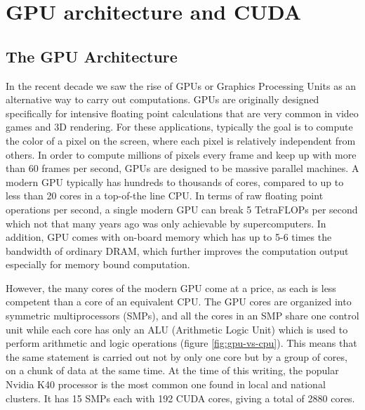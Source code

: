 
\chapter{GPU architecture and CUDA}
\label{app:gpu}


\section{The GPU Architecture}
\label{sec:gpu-arch}

In the recent decade we saw the rise of GPUs or Graphics Processing Units as an
alternative way to carry out computations. GPUs are originally designed
specifically for intensive floating point calculations that are very common in
video games and 3D rendering. For these applications, typically the goal is to
compute the color of a pixel on the screen, where each pixel is relatively
independent from others. In order to compute millions of pixels every frame and
keep up with more than 60 frames per second, GPUs are designed to be massive
parallel machines. A modern GPU typically has hundreds to thousands of cores,
compared to up to less than 20 cores in a top-of-the line CPU. In terms of raw
floating point operations per second, a single modern GPU can break 5 TetraFLOPs
per second which not that many years ago was only achievable by supercomputers.
In addition, GPU comes with on-board memory which has up to 5-6 times the
bandwidth of ordinary DRAM, which further improves the computation output
especially for memory bound computation.

However, the many cores of the modern GPU come at a price, as each is less
competent than a core of an equivalent CPU. The GPU cores are organized into
symmetric multiprocessors (SMPs), and all the cores in an SMP share one control
unit while each core has only an ALU (Arithmetic Logic Unit) which is used to
perform arithmetic and logic operations (figure \ref{fig:gpu-vs-cpu}). This
means that the same statement is carried out not by only one core but by a group
of cores, on a chunk of data at the same time. At the time of this writing, the
popular Nvidia K40 processor is the most common one found in local and national
clusters. It has 15 SMPs each with 192 CUDA cores, giving a total of 2880 cores.

